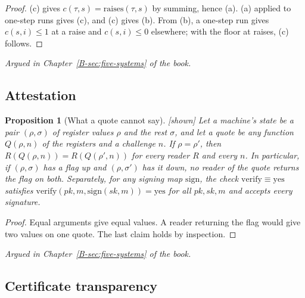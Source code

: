 \documentclass[11pt, a4paper]{article}
\theoremstyle{plain}
\newtheorem{proposition}[theorem]{Proposition}
\theoremstyle{definition}
\theoremstyle{remark}
\newcommand{\cost}{c}
\newcommand{\argued}[1]{\par\noindent\textit{Argued in Chapter~\ref{B-#1} of the book.}\par}
\newcommand{\kind}[1]{\textup{[#1]}}
\begin{document}
\begin{proof}
(c) gives $\cost(\tau,s)=\mathrm{raises}(\tau,s)$ by summing, hence (a). (a) applied to one-step runs gives
(c), and (c) gives (b). From (b), a one-step run gives $\cost(s,i)\le1$ at a raise and $\cost(s,i)\le0$
elsewhere; with the floor at raises, (c) follows.
\end{proof}

\argued{sec:five-systems}

\subsection*{Attestation}

\begin{proposition}[What a quote cannot say]\label{spec:quote} \kind{shown}
Let a machine's state be a pair $(\rho,\sigma)$ of register values $\rho$ and the rest $\sigma$, and let a
quote be any function $Q(\rho,n)$ of the registers and a challenge $n$. If $\rho=\rho'$, then
$R(Q(\rho,n))=R(Q(\rho',n))$ for every reader $R$ and every $n$. In particular, if $(\rho,\sigma)$ has a flag
up and $(\rho,\sigma')$ has it down, no reader of the quote returns the flag on both. Separately, for any
signing map $\mathrm{sign}$, the check $\mathrm{verify}\equiv\mathrm{yes}$ satisfies
$\mathrm{verify}(pk,m,\mathrm{sign}(sk,m))=\mathrm{yes}$ for all $pk,sk,m$ and accepts every signature.
\end{proposition}

\begin{proof}
Equal arguments give equal values. A reader returning the flag would give two values on one quote. The
last claim holds by inspection.
\end{proof}

\argued{sec:five-systems}

\subsection*{Certificate transparency}
\end{document}
